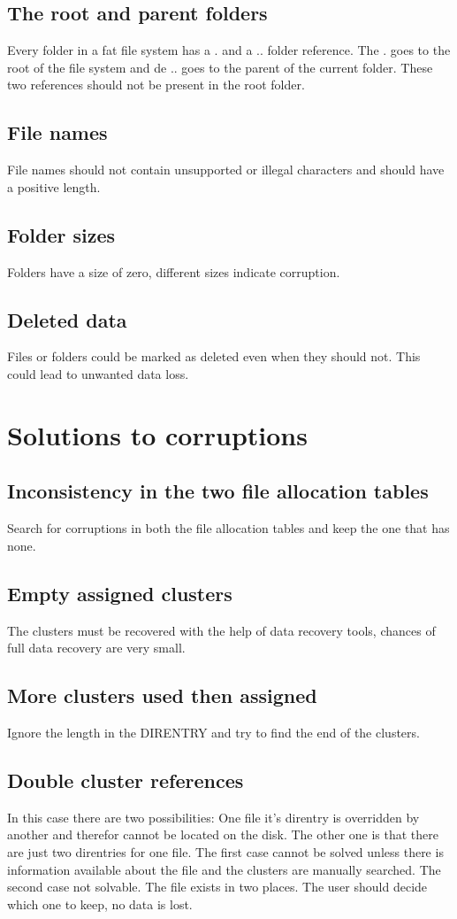 \documentclass[pdftex,12pt,a4paper]{article}
\begin{document}
\subsection{The root and parent folders}
Every folder in a fat file system has a . and a .. folder reference. The . goes to the root of the file system and de .. goes to the parent of the current folder. These two references should not be present in the root folder.
\subsection{File names}
File names should not contain unsupported or illegal characters and should have a positive length.
\subsection{Folder sizes}
Folders have a size of zero, different sizes indicate corruption.
\subsection{Deleted data}
Files or folders could be marked as deleted even when they should not. This could lead to unwanted data loss. 

\section{Solutions to corruptions}
\subsection{Inconsistency in the two file allocation tables}
Search for corruptions in both the file allocation tables and keep the one that has none.
\subsection{Empty assigned clusters}
The clusters must be recovered with the help of data recovery tools, chances of full data recovery are very small.
\subsection{More clusters used then assigned}
Ignore the length in the DIRENTRY and try to find the end of the clusters.
\subsection{Double cluster references}
In this case there are two possibilities: One file it's direntry is overridden by another and therefor cannot be located on the disk. The other one is that there are just two direntries for one file. The first case cannot be solved unless there is information available about the file and the clusters are manually searched. The second case not solvable. The file exists in two places. The user should decide which one to keep, no data is lost.
\end{document}
